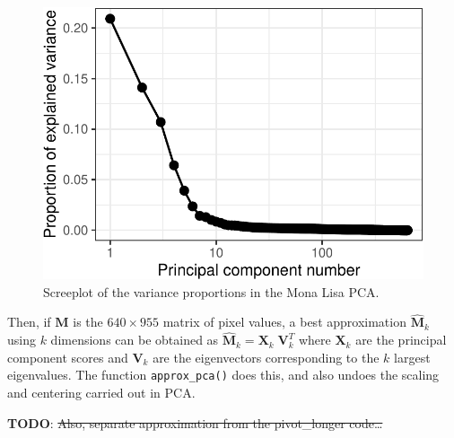 \documentclass[
  letterpaper,
  10pt,
  krantz2]{krantz}
\begin{document}
\begin{figure}[H]

{\centering \includegraphics[width=1\textwidth,height=\textheight]{figs/ch04/fig-mona-screeplot-1.pdf}

}

\caption{\label{fig-mona-screeplot}Screeplot of the variance proportions
in the Mona Lisa PCA.}

\end{figure}

Then, if \(\mathbf{M}\) is the \(640 \times 955\) matrix of pixel
values, a best approximation \(\widehat{\mathbf{M}}_k\) using \(k\)
dimensions can be obtained as
\(\widehat{\mathbf{M}}_k = \mathbf{X}_k\;\mathbf{V}_k^T\) where
\(\mathbf{X}_k\) are the principal component scores and \(\mathbf{V}_k\)
are the eigenvectors corresponding to the \(k\) largest eigenvalues. The
function \texttt{approx\_pca()} does this, and also undoes the scaling
and centering carried out in PCA.

\textbf{TODO}: \st{Also, separate approximation from the pivot\_longer
code\ldots{}}
\end{document}

